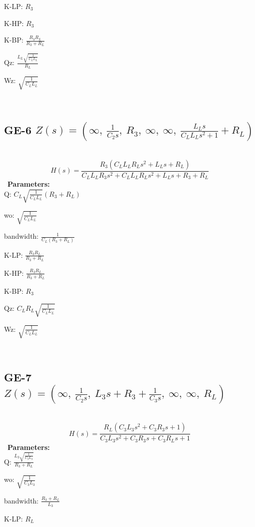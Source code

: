 \documentclass{article}
\begin{document}
K-LP: $R_{3}$\ 

K-HP: $R_{3}$\ 

K-BP: $\frac{R_{3} R_{L}}{R_{3} + R_{L}}$\ 

Qz: $\frac{L_{L} \sqrt{\frac{1}{C_{L} L_{L}}}}{R_{L}}$\ 

Wz: $\sqrt{\frac{1}{C_{L} L_{L}}}$\ 

\ 

\subsection{GE-6 $Z(s) = \left( \infty, \  \frac{1}{C_{2} s}, \  R_{3}, \  \infty, \  \infty, \  \frac{L_{L} s}{C_{L} L_{L} s^{2} + 1} + R_{L}\right)$ } \ 
\textbf{\[H(s) = \frac{R_{3} \left(C_{L} L_{L} R_{L} s^{2} + L_{L} s + R_{L}\right)}{C_{L} L_{L} R_{3} s^{2} + C_{L} L_{L} R_{L} s^{2} + L_{L} s + R_{3} + R_{L}}\] } \ 
\textbf{Parameters:}\\ 

Q: $C_{L} \sqrt{\frac{1}{C_{L} L_{L}}} \left(R_{3} + R_{L}\right)$\ 

wo: $\sqrt{\frac{1}{C_{L} L_{L}}}$\ 

bandwidth: $\frac{1}{C_{L} \left(R_{3} + R_{L}\right)}$\ 

K-LP: $\frac{R_{3} R_{L}}{R_{3} + R_{L}}$\ 

K-HP: $\frac{R_{3} R_{L}}{R_{3} + R_{L}}$\ 

K-BP: $R_{3}$\ 

Qz: $C_{L} R_{L} \sqrt{\frac{1}{C_{L} L_{L}}}$\ 

Wz: $\sqrt{\frac{1}{C_{L} L_{L}}}$\ 

\ 

\subsection{GE-7 $Z(s) = \left( \infty, \  \frac{1}{C_{2} s}, \  L_{3} s + R_{3} + \frac{1}{C_{3} s}, \  \infty, \  \infty, \  R_{L}\right)$ } \ 
\textbf{\[H(s) = \frac{R_{L} \left(C_{3} L_{3} s^{2} + C_{3} R_{3} s + 1\right)}{C_{3} L_{3} s^{2} + C_{3} R_{3} s + C_{3} R_{L} s + 1}\] } \ 
\textbf{Parameters:}\\ 

Q: $\frac{L_{3} \sqrt{\frac{1}{C_{3} L_{3}}}}{R_{3} + R_{L}}$\ 

wo: $\sqrt{\frac{1}{C_{3} L_{3}}}$\ 

bandwidth: $\frac{R_{3} + R_{L}}{L_{3}}$\ 

K-LP: $R_{L}$\ 
\end{document}
